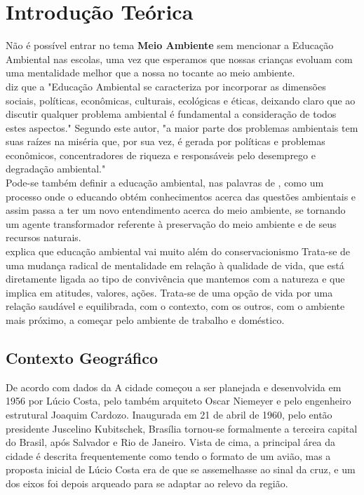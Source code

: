 \chapter{Introdução Teórica}

Não é possível entrar no tema \textbf{Meio Ambiente} sem mencionar a Educação Ambiental nas escolas, uma vez que esperamos que nossas crianças evoluam com uma mentalidade melhor que a nossa no tocante ao meio ambiente.\\

  diz que a "Educação Ambiental se caracteriza por
incorporar as dimensões sociais, políticas, econômicas,
culturais, ecológicas e éticas, deixando claro que ao discutir
qualquer problema ambiental é fundamental a consideração
de todos estes aspectos." Segundo este autor, "a maior parte
dos problemas ambientais tem suas raízes na miséria que,
por sua vez, é gerada por políticas e problemas econômicos,
concentradores de riqueza e responsáveis pelo desemprego
e degradação ambiental."\\

Pode-se também definir a educação ambiental, nas palavras de , como um processo
onde o educando obtém conhecimentos acerca das
questões ambientais e assim passa a ter um novo
entendimento acerca do meio ambiente, se tornando um
agente transformador referente à preservação do meio
ambiente e de seus recursos naturais. \\

 explica que educação ambiental vai muito além do conservacionismo
Trata-se de uma mudança radical de mentalidade em
relação à qualidade de vida, que está diretamente ligada
ao tipo de convivência que mantemos com a natureza e
que implica em atitudes, valores, ações. Trata-se de uma
opção de vida por uma relação saudável e equilibrada,
com o contexto, com os outros, com o ambiente mais
próximo, a começar pelo ambiente de trabalho e
doméstico.\\

\section{Contexto Geográfico}

De acordo com dados da  A cidade começou a ser planejada e desenvolvida em 1956 por Lúcio Costa, pelo também arquiteto Oscar Niemeyer e pelo engenheiro estrutural Joaquim Cardozo. Inaugurada em 21 de abril de 1960, pelo então presidente Juscelino Kubitschek, Brasília tornou-se formalmente a terceira capital do Brasil, após Salvador e Rio de Janeiro. Vista de cima, a principal área da cidade é descrita frequentemente como tendo o formato de um avião, mas a proposta inicial de Lúcio Costa era de que se assemelhasse ao sinal da cruz, e um dos eixos foi depois arqueado para se adaptar ao relevo da região.\\

